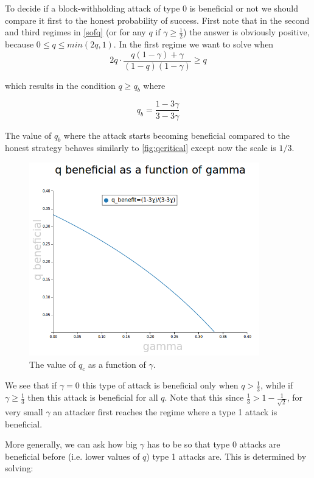 \documentclass[letterpaper,12pt]{report}
\theoremstyle{plain}
\theoremstyle{definition}
\begin{document}
To decide if a block-withholding attack of type 0 is beneficial or not we should compare it first to the honest probability of success. First note that in the second and third regimes in \ref{sofq} (or for any $q$ if $\gamma\geq\frac{1}{2}$) the answer is obviously positive, because $0\leq q \leq min(2q,1)$. In the first regime we want to solve when
\begin{equation}\label{type0benefitonhonestequation}
2q\cdot\frac{q(1-\gamma)+\gamma}{(1-q)(1-\gamma)}\geq q
\end{equation}

which results in the condition $q\geq q_b$ where 

\begin{equation}\label{type0benefitonhonestresult}
q_b= \dfrac{1-3\gamma}{3-3\gamma}
\end{equation}

The value of $q_b$ where the attack starts becoming beneficial compared to the honest strategy behaves similarly to \ref{fig:qcritical} except now the scale is $1/3$.

\begin{figure}[qcrit]
\centering
\includegraphics[width=100mm]{qbenefit.png}
\caption{The value of $q_c$ as a function of $\gamma$.}
\label{fig:qbenefit}
\end{figure}

We see that if $\gamma=0$ this type of attack is beneficial only when $q>\frac{1}{3}$, while if $\gamma\geq\frac{1}{3}$ then this attack is beneficial for all $q$.
Note that this since $\frac{1}{3}>1-\frac{1}{\sqrt{2}}$, for very small $\gamma$ an attacker first reaches the regime where a type 1 attack is beneficial.

More generally, we can ask how big $\gamma$ has to be so that type 0 attacks are beneficial before (i.e. lower values of $q$) type 1 attacks are. This is determined by solving:
\end{document}
